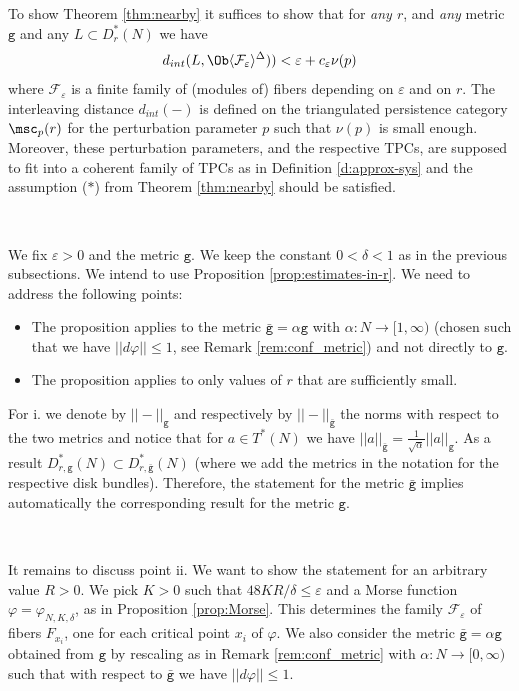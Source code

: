 To show Theorem \ref{thm:nearby} it suffices to show that for {\em any $r$}, and {\em any} metric $\mathtt{g}$ and any $L\subset D^{\ast}_{r}(N)$ we have 
 $$d_{int}(L, \Ob \langle \mathcal{F}_{\varepsilon}
 \rangle^{\Delta})) < \varepsilon+c_{\varepsilon}\nu(p)$$ where $\mathcal{F}_{\varepsilon}$ is a finite family of (modules of) fibers  depending on $\varepsilon$ and on $r$. The interleaving distance $d_{int}(-)$ is defined on the 
 triangulated persistence category $\msc_{p}(r)$ for the perturbation parameter $p$ such that $\nu(p)$ is small enough. Moreover, these perturbation parameters, and the respective TPCs, are supposed to fit into a coherent family of TPCs as in Definition \ref{d:approx-sys} and 
 the assumption ($\ast$) from Theorem \ref{thm:nearby} should be satisfied.
  
  \
  
 We fix $\varepsilon > 0$ and the metric $\mathtt{g}$. We keep the constant $0<\delta < 1$ as in the previous subsections.  
 We intend to use  Proposition \ref{prop:estimates-in-r}. We need to address the following points: 
 \begin{itemize}
 \item[i.] The proposition applies to the metric $\bar{\mathtt{g}}=\alpha \mathtt{g}$ with $\alpha:N\to [1,\infty)$ (chosen such  that we have $||d\varphi||\leq 1$, see Remark \ref{rem:conf_metric}) and not directly to $\mathtt{g}$.
 \item[ii.] The proposition applies to only values of $r$ that are sufficiently small.
 \end{itemize}
 
 For i. we denote by $|| - ||_{\mathtt{g}}$ and respectively by
 $||-||_{\bar{\mathtt{g}}}$ the norms with respect to the two metrics and 
 notice that for $a\in T^{\ast}(N)$ we have $||a||_{\bar{\mathtt{g}}}=\frac{1}{\sqrt{\alpha}}||a||_{\mathtt{g}}$. As a result $D^{\ast}_{r,\mathtt{g}}(N)\subset D^{\ast}_{r, \bar{\mathtt{g}}}(N)$ (where we add the metrics in the notation for the respective disk bundles).  Therefore,  the statement for the metric $\bar{\mathtt{g}}$ implies automatically  the corresponding result for the metric $\mathtt{g}$. 
 
 \
 
 It remains to discuss  point ii.  We want to show the statement for an arbitrary  value $R>0$. We pick $K>0$ such that  $48 K R/\delta \leq \varepsilon$ and a Morse function $\varphi=\varphi_{N,K,\delta}$, as in Proposition \ref{prop:Morse}.  This determines the family $\mathcal{F}_{\varepsilon}$ of fibers $F_{x_{i}}$, one for each critical point $x_{i}$ of $\varphi$.  We also consider the metric $\bar{\mathtt{g}}=\alpha \mathtt{g}$ obtained from $\mathtt{g}$ by rescaling as in Remark \ref{rem:conf_metric} with $\alpha :N\to [0,\infty)$ such that with respect to $\bar{\mathtt{g}}$ we have $||d\varphi||\leq 1$.

